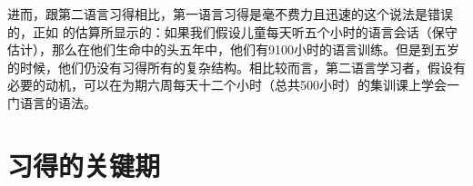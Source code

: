 
进而，跟第二语言习得相比，第一语言习得是毫不费力且迅速的这个说法是错误的，正如 \citet[]{Klein86a-u}的估算所显示的：如果我们假设儿童每天听五个小时的语言会话（保守估计），那么在他们生命中的头五年中，他们有9100小时的语言训练。但是到五岁的时候，他们仍没有习得所有的复杂结构。相比较而言，第二语言学习者，假设有必要的动机，可以在为期六周每天十二个小时（总共500小时）的集训课上学会一门语言的语法。

\section{习得的关键期}

